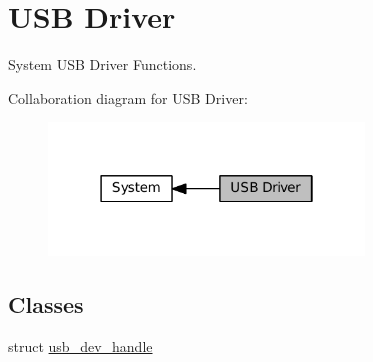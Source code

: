 \hypertarget{group__SYSTEM__USB__DRIVER}{}\section{U\+SB Driver}
\label{group__SYSTEM__USB__DRIVER}


System U\+SB Driver Functions.  


Collaboration diagram for U\+SB Driver\+:\nopagebreak
\begin{figure}[H]
\begin{center}
\leavevmode
\includegraphics[width=238pt]{group__SYSTEM__USB__DRIVER}
\end{center}
\end{figure}
\subsection*{Classes}
\begin{DoxyCompactItemize}
\item 
struct \hyperlink{structusb__dev__handle}{usb\+\_\+dev\+\_\+handle}
\end{DoxyCompactItemize}
